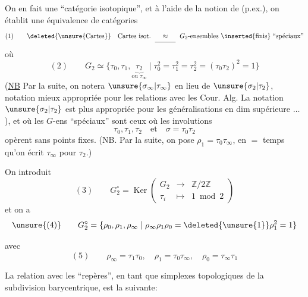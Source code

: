 
On en fait une ``catégorie isotopique'', et à l'aide de la notion de  (p.ex.), on établit une équivalence de catégories
\[
(1)\qquad \deleted{\text{\unsure{Cartes}}}\quad\text{Cartes isot.}\ \underset{\rule{1.1cm}{0.3pt}}{\approx}\ G_2\text{-ensembles }\inserted{\text{finis}}\text{ ``spéciaux''}
\]
où
\[
(2)\qquad G_2\simeq\{\tau_0,\tau_1,\underbrace{\tau_2}_{\text{ou }\tau_\infty}\mid
\tau_0^2=\tau_1^2=\tau_2^2=(\tau_0\tau_2)^2=1\}
\]
(\uline{NB} Par la suite, on notera $\unsure{\sigma_\infty|\tau_\infty}$ en lieu de $\unsure{\sigma_2|\tau_2}$, notation mieux appropriée pour les relations avec les Cour. Alg. La notation $\unsure{\sigma_2|\tau_2}$ est plus appropriée pour les généralisations en dim supérieure $\ldots$),
et où les $G$-ens ``spéciaux'' sont ceux où les involutions
\[
\tau_0,\tau_1,\tau_2\quad\text{et}\quad\sigma=\tau_0\tau_2
\]
opèrent sans points fixes. (NB. Par la suite, on pose $\rho_1=\tau_0\tau_\infty$, en $=$ temps qu'on écrit $\tau_\infty$ pour $\tau_2$.)

On introduit
\[
(3)\qquad G_2^\circ=\operatorname{Ker}\left(\begin{array}{rcl}
G_2&\longrightarrow&\mathbb Z/2\mathbb Z\\
\tau_i&\longmapsto&1\bmod2
\end{array}\right)
\]
et on a
\[
\unsure{(4)}\qquad G_2^\circ=\{\rho_0,\rho_1,\rho_\infty\mid\rho_\infty\rho_1\rho_0=\deleted{\unsure{1}}\rho_1^2=1\}
\]

avec
\[
(5)\qquad\rho_\infty=\tau_1\tau_0,\quad\rho_1=\tau_0\tau_\infty,\quad\rho_0=\tau_\infty\tau_1
\]

La relation avec les ``repères'', en tant que simplexes topologiques de la subdivision barycentrique, est la suivante:

